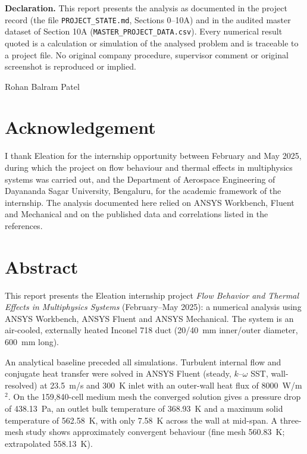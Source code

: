 \textbf{Declaration.} This report presents the analysis as documented in the project record (the file
\texttt{PROJECT\_STATE.md}, Sections 0--10A) and in the audited master dataset of Section 10A
(\texttt{MASTER\_PROJECT\_DATA.csv}). Every numerical result quoted is a
calculation or simulation of the analysed problem and is traceable to a project file. No original company procedure, supervisor
comment or original screenshot is reproduced or implied.

\vspace{6mm}
Rohan Balram Patel

\clearpage   %
\chapter*{Acknowledgement}
I thank Eleation for the internship opportunity between February and May 2025, during which the project on flow behaviour and
thermal effects in multiphysics systems was carried out, and the Department of Aerospace Engineering of Dayananda Sagar University,
Bengaluru, for the academic framework of the internship. The analysis documented here relied on ANSYS Workbench, Fluent and Mechanical
and on the published data and correlations listed in the references.

\chapter*{Abstract}
This report presents the Eleation internship project \emph{Flow Behavior and Thermal Effects in Multiphysics Systems}
(February--May 2025): a numerical analysis using ANSYS Workbench, ANSYS Fluent and ANSYS Mechanical. The system is an air-cooled,
externally heated Inconel 718 duct (20/40~mm inner/outer diameter, 600~mm long).

An analytical baseline preceded all simulations. Turbulent internal flow and conjugate heat transfer were solved in ANSYS Fluent (steady,
$k$--$\omega$ SST, wall-resolved) at 23.5~m/s and 300~K inlet with an outer-wall heat flux of 8000~W/m$^2$. On the 159,840-cell
medium mesh the converged solution gives a pressure drop of 438.13~Pa, an outlet bulk temperature of 368.93~K and a maximum
solid temperature of 562.58~K, with only 7.58~K across the wall at mid-span. A three-mesh study shows approximately convergent behaviour
(fine mesh 560.83~K; extrapolated 558.13~K).

